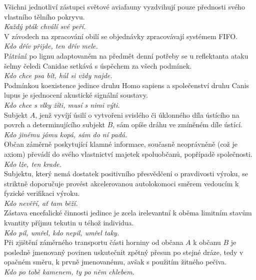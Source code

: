 \begin{multicols}{2}
\noindent
Všichni jednotliví zástupci světové aviafauny vyzdvihují pouze
přednosti svého vlastního tělního pokryvu.\\[1 mm]
{\sl Každý pták chválí své peří.}\\

\noindent
V závodech na zpracování obilí se objednávky zpracovávají
systémem FIFO.\\[1 mm]
{\sl Kdo dřív přijde, ten dřív mele.}\\

\noindent
Pátrání po lignu adaptovaném na předmět denní potřeby se
u reflektanta ataku šelmy čeledi Canidae setkává s úspěchem za
všech podmínek.\\[1 mm]
{\sl Kdo chce psa bít, hůl si vždy najde.}\\

\noindent
Podmínkou koexistence jedince druhu Homo sapiens a společenství
druhu Canis lupus je sjednocení akustické signální soustavy.\\[1 mm]
{\sl Kdo chce s vlky žíti, musí s nimi výti.}\\

\noindent
Subjekt $A$, jenž vyvíjí úsilí o vytvořeni svislého či úklonného
díla ústícího na povrch a determinujícího subjekt $B$, sám opíše
dráhu ve zmíněném díle ústící.\\[1 mm]
{\sl Kdo jinému jámu kopá, sám do ní padá.}\\

\noindent
Občan záměrně poskytující klamné informace, současně neoprávněně
(což je axiom) převádí do svého vlastnictví majetek spoluobčanů,
popřípadě společnosti.\\[1 mm]
{\sl Kdo lže, ten krade.}\\

\noindent
Subjektu, který nemá dostatek positivního přesvědčení o pravdivosti
výroku, se striktně doporučuje provést akcelerovanou autolokomoci
směrem vedoucím k fyzické verifikaci výroku.\\[1 mm]
{\sl Kdo nevěří, ať tam běží.}\\

\noindent
Zástava encefalické činnosti jedince je zcela irelevantní k oběma
limitním stavům kvantity příjmu tekutin u téhož individua.\\[1 mm]
{\sl Kdo pil, umřel, kdo nepil, umřel taky.}\\

\noindent
Při zjištění záměrného transportu části horniny od občana
$A$ k občanu $B$ je posledně jmenovaný povinen uskutečnit zpětný
přesun po stejné dráze, tedy v opačném směru, k prvně jmenovanému,
avšak s použitím žitného pečiva.\\[1 mm]
{\sl Kdo po tobě kamenem, ty po něm chlebem.}\\


\end{multicols}
